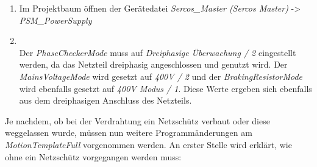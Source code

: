 \documentclass[../../../Bachelorarbeit.tex]{subfiles}
\begin{document}
\begin{enumerate}
    \item Im Projektbaum öffnen der Gerätedatei \textit{Sercos\_Master (Sercos Master)} -> \\ \textit{PSM\_PowerSupply}
    \item \begin{minipage}[t]{\linewidth}
        \raggedright
        \label{fig:my-img38}
    \end{minipage}
    \bigskip \\
    Der \textit{PhaseCheckerMode} muss auf \textit{Dreiphasige Überwachung / 2} eingestellt werden, da das Netzteil dreiphasig angeschlossen und genutzt wird. Der \textit{MainsVoltageMode} wird gesetzt auf \textit{400\si{V} / 2} und der \textit{BrakingResistorMode} wird ebenfalls gesetzt auf \textit{400\si{V} Modus / 1}. Diese Werte ergeben sich ebenfalls aus dem dreiphasigen Anschluss des Netzteils.
\end{enumerate}

Je nachdem, ob bei der Verdrahtung ein Netzschütz verbaut oder diese weggelassen wurde, müssen nun weitere Programmänderungen am \textit{MotionTemplateFull} vorgenommen werden. An erster Stelle wird erklärt, wie ohne ein Netzschütz vorgegangen werden muss:
\end{document}
